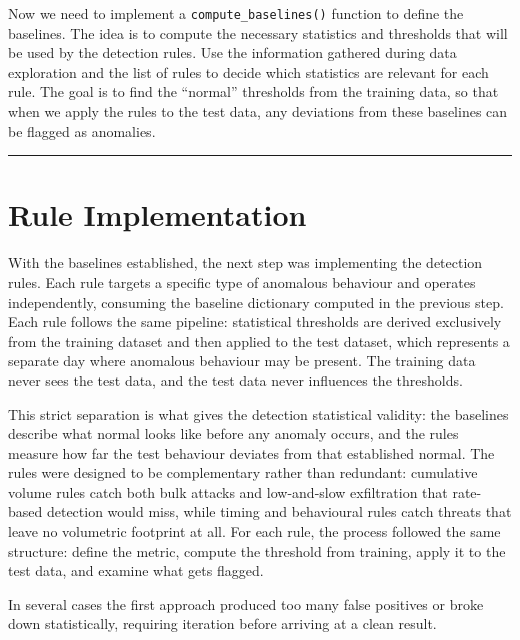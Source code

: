 \documentclass[
  11pt,
]{article}
\begin{document}
\begin{aiprompt}
Now we need to implement a \texttt{compute\_baselines()} function to define the baselines. The idea is to compute the necessary statistics and thresholds that will be used by the detection rules. Use the information gathered during data exploration and the list of rules to decide which statistics are relevant for each rule. The goal is to find the ``normal'' thresholds from the training data, so that when we apply the rules to the test data, any deviations from these baselines can be flagged as anomalies.
\end{aiprompt}

\begin{center}\rule{0.5\linewidth}{0.5pt}\end{center}

\hypertarget{rule-implementation}{%
\section{Rule Implementation}\label{rule-implementation}}

With the baselines established, the next step was implementing the
detection rules. Each rule targets a specific type of anomalous
behaviour and operates independently, consuming the baseline dictionary
computed in the previous step. Each rule follows the same pipeline:
statistical thresholds are derived exclusively from the training dataset
and then applied to the test dataset, which represents a separate day
where anomalous behaviour may be present. The training data never sees
the test data, and the test data never influences the thresholds.

This strict separation is what gives the detection statistical validity:
the baselines describe what normal looks like before any anomaly occurs,
and the rules measure how far the test behaviour deviates from that
established normal. The rules were designed to be complementary rather
than redundant: cumulative volume rules catch both bulk attacks and
low-and-slow exfiltration that rate-based detection would miss, while
timing and behavioural rules catch threats that leave no volumetric
footprint at all. For each
rule, the process followed the same structure: define the metric,
compute the threshold from training, apply it to the test data, and
examine what gets flagged.

In several cases the first approach produced too many false positives or
broke down statistically, requiring iteration before arriving at a clean
result.
\end{document}
